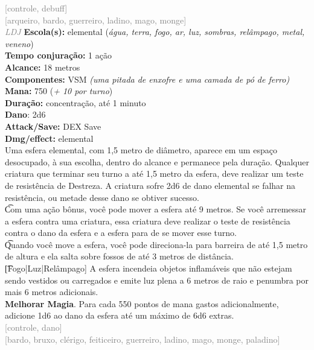 \documentclass{RPG_Adventure}[2021/10/20]
\begin{document}
{\scriptsize \textcolor{gray}{[controle, debuff]\\}}
{\scriptsize \textcolor{gray}{[arqueiro, bardo, guerreiro, ladino, mago, monge]\\}}
{\tiny \textcolor{gray}{\textit{LDJ}}}
{\small \t \textbf{Escola(s):} elemental (\textit{água, terra, fogo, ar, luz, sombras, relâmpago, metal, veneno})\\\t \textbf{Tempo conjuração:} 1 ação\\\t \textbf{Alcance:} 18 metros\\\t \textbf{Componentes:} VSM \textit{(uma pitada de enxofre e uma camada de pó de ferro)}\\\t \textbf{Mana:} 750 (\textit{+ 10 por turno})\\\t \textbf{Duração:} concentração, até 1 minuto\\\t \textbf{Dano}: 2d6\\\t \textbf{Attack/Save:} DEX Save\\\t \textbf{Dmg/effect:} elemental\\}
{\normalsize Uma esfera elemental, com 1,5 metro de diâmetro, aparece em um espaço desocupado, à sua escolha, dentro do alcance e permanece pela duração. Qualquer criatura que terminar seu turno a até 1,5 metro da esfera, deve realizar um teste de resistência de Destreza. A criatura sofre 2d6 de dano elemental se falhar na resistência, ou metade desse dano se obtiver sucesso.\\\t Com uma ação bônus, você pode mover a esfera até 9 metros. Se você arremessar a esfera contra uma criatura, essa criatura deve realizar o teste de resistência contra o dano da esfera e a esfera para de se mover esse turno.\\\t Quando você move a esfera, você pode direciona-la para barreira de até 1,5 metro de altura e ela salta sobre fossos de até 3 metros de distância.\\\t [Fogo|Luz|Relâmpago] A esfera incendeia objetos inflamáveis que não estejam sendo vestidos ou carregados e emite luz plena a 6 metros de raio e penumbra por mais 6 metros adicionais.\\\t \textbf{Melhorar Magia}. Para cada 550 pontos de mana gastos adicionalmente, adicione 1d6 ao dano da esfera até um máximo de 6d6 extras.\\}
{\scriptsize \textcolor{gray}{[controle, dano]\\}}
{\scriptsize \textcolor{gray}{[bardo, bruxo, clérigo, feiticeiro, guerreiro, ladino, mago, monge, paladino]\\}}
\end{document}
